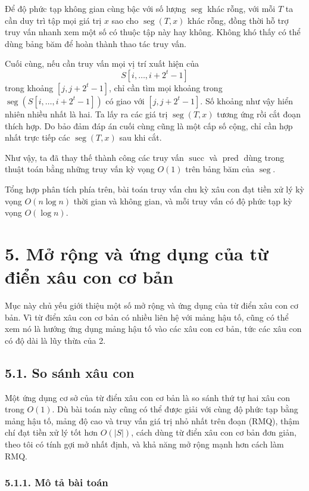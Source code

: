 \documentclass[11pt]{article}
\begin{document}
Để độ phức tạp không gian cùng bậc với số lượng \(\operatorname{seg}\) khác
rỗng, với mỗi \(T\) ta cần duy trì tập mọi giá trị \(x\) sao cho
\(\operatorname{seg}(T,x)\) khác rỗng, đồng thời hỗ trợ truy vấn nhanh xem một
số có thuộc tập này hay không. Không khó thấy có thể dùng bảng băm để hoàn
thành thao tác truy vấn.

Cuối cùng, nếu cần truy vấn mọi vị trí xuất hiện của
\[
  S[i,\ldots,i+2^t-1]
\]
trong khoảng \([j,j+2^t-1]\), chỉ cần tìm mọi khoảng trong
\(\operatorname{seg}(S[i,\ldots,i+2^t-1])\) có giao với \([j,j+2^t-1]\). Số
khoảng như vậy hiển nhiên nhiều nhất là hai. Ta lấy ra các giá trị
\(\operatorname{seg}(T,x)\) tương ứng rồi cắt đoạn thích hợp. Do bảo đảm đáp án
cuối cùng cũng là một cấp số cộng, chỉ cần hợp nhất trực tiếp các
\(\operatorname{seg}(T,x)\) sau khi cắt.

Như vậy, ta đã thay thế thành công các truy vấn \(\operatorname{succ}\) và
\(\operatorname{pred}\) dùng trong thuật toán bằng những truy vấn kỳ vọng
\(O(1)\) trên bảng băm của \(\operatorname{seg}\).

Tổng hợp phân tích phía trên, bài toán truy vấn chu kỳ xâu con đạt tiền xử lý
kỳ vọng \(O(n\log n)\) thời gian và không gian, và mỗi truy vấn có độ phức tạp
kỳ vọng \(O(\log n)\).

\section*{5. Mở rộng và ứng dụng của từ điển xâu con cơ bản}

Mục này chủ yếu giới thiệu một số mở rộng và ứng dụng của từ điển xâu con cơ
bản. Vì từ điển xâu con cơ bản có nhiều liên hệ với mảng hậu tố, cũng có thể
xem nó là hướng ứng dụng mảng hậu tố vào các xâu con cơ bản, tức các xâu con
có độ dài là lũy thừa của 2.

\subsection*{5.1. So sánh xâu con}

Một ứng dụng cơ sở của từ điển xâu con cơ bản là so sánh thứ tự hai xâu con
trong \(O(1)\). Dù bài toán này cũng có thể được giải với cùng độ phức tạp
bằng mảng hậu tố, mảng độ cao và truy vấn giá trị nhỏ nhất trên đoạn (RMQ),
thậm chí đạt tiền xử lý tốt hơn \(O(|S|)\), cách dùng từ điển xâu con cơ bản
đơn giản, theo tôi có tính gợi mở nhất định, và khả năng mở rộng mạnh hơn cách
làm RMQ.

\subsubsection*{5.1.1. Mô tả bài toán}
\end{document}
